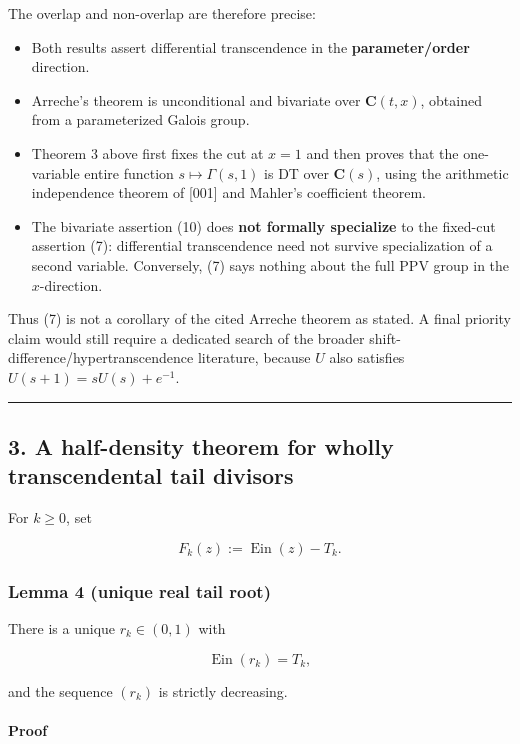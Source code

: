 \documentclass[11pt]{article}
\theoremstyle{keio}
\theoremstyle{definition}
\theoremstyle{remark}
\newcommand{\Ein}{\operatorname{Ein}}
\providecommand{\tightlist}{\setlength{\itemsep}{0pt}\setlength{\parskip}{0pt}}
\begin{document}
The overlap and non-overlap are therefore precise:

\begin{itemize}
\tightlist
\item
  Both results assert differential transcendence in the \textbf{parameter/order}
  direction.
\item
  Arreche's theorem is unconditional and bivariate over \(\mathbf C(t,x)\),
  obtained from a parameterized Galois group.
\item
  Theorem 3 above first fixes the cut at \(x=1\) and then proves that the
  one-variable entire function \(s\mapsto\Gamma(s,1)\) is DT over
  \(\mathbf C(s)\), using the arithmetic independence theorem of {[}001{]} and
  Mahler's coefficient theorem.
\item
  The bivariate assertion (10) does \textbf{not formally specialize} to the
  fixed-cut assertion (7): differential transcendence need not survive
  specialization of a second variable. Conversely, (7) says nothing about
  the full PPV group in the \(x\)-direction.
\end{itemize}

Thus (7) is not a corollary of the cited Arreche theorem as stated. A final
priority claim would still require a dedicated search of the broader
shift-difference/hypertranscendence literature, because \(U\) also satisfies
\(U(s+1)=sU(s)+e^{-1}\).

\begin{center}\rule{0.5\linewidth}{0.5pt}\end{center}

\subsection{3. A half-density theorem for wholly transcendental tail divisors}

For \(k\ge0\), set

\[
 F_k(z):=\Ein(z)-T_k.
\]

\subsubsection{Lemma 4 (unique real tail root)}

There is a unique \(r_k\in(0,1)\) with

\[
 \Ein(r_k)=T_k,                                                             \tag{GT-12}
\]

and the sequence \((r_k)\) is strictly decreasing.

\paragraph{Proof}
\end{document}
